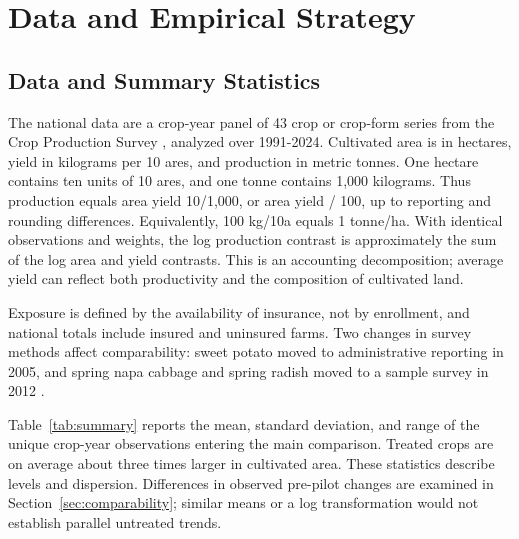 \chapter{Data and Empirical Strategy}\label{ch:data}

\section{Data and Summary Statistics}\label{sec:data}

The national data are a crop-year panel of 43 crop or crop-form series from the Crop Production Survey \citep{statkorea_nd}, analyzed over 1991-2024. Cultivated area is in hectares, yield in kilograms per 10 ares, and production in metric tonnes. One hectare contains ten units of 10 ares, and one tonne contains 1,000 kilograms. Thus production equals area \texttimes{} yield \texttimes{} 10/1,000, or area \texttimes{} yield / 100, up to reporting and rounding differences. Equivalently, 100 kg/10a equals 1 tonne/ha. With identical observations and weights, the log production contrast is approximately the sum of the log area and yield contrasts. This is an accounting decomposition; average yield can reflect both productivity and the composition of cultivated land.

Exposure is defined by the availability of insurance, not by enrollment, and national totals include insured and uninsured farms. Two changes in survey methods affect comparability: sweet potato moved to administrative reporting in 2005, and spring napa cabbage and spring radish moved to a sample survey in 2012 \citep{statkorea2014}.

Table~\ref{tab:summary} reports the mean, standard deviation, and range of the unique crop-year observations entering the main comparison. Treated crops are on average about three times larger in cultivated area. These statistics describe levels and dispersion. Differences in observed pre-pilot changes are examined in Section~\ref{sec:comparability}; similar means or a log transformation would not establish parallel untreated trends.


